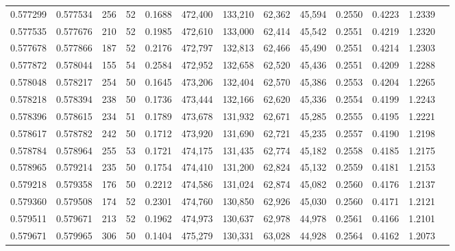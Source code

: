 \begin{tabular}{rrrrrrrrrrrrr}
0.577299 & 0.577534 &   256 &  52 &                                     0.1688 & 472,400 & 133,210 &  62,362 &  45,594 & 0.2550 & 0.4223 & 1.2339 \\
0.577535 & 0.577676 &   210 &  52 &                                     0.1985 & 472,610 & 133,000 &  62,414 &  45,542 & 0.2551 & 0.4219 & 1.2320 \\
0.577678 & 0.577866 &   187 &  52 &                                     0.2176 & 472,797 & 132,813 &  62,466 &  45,490 & 0.2551 & 0.4214 & 1.2303 \\
0.577872 & 0.578044 &   155 &  54 &                                     0.2584 & 472,952 & 132,658 &  62,520 &  45,436 & 0.2551 & 0.4209 & 1.2288 \\
0.578048 & 0.578217 &   254 &  50 &                                     0.1645 & 473,206 & 132,404 &  62,570 &  45,386 & 0.2553 & 0.4204 & 1.2265 \\
0.578218 & 0.578394 &   238 &  50 &                                     0.1736 & 473,444 & 132,166 &  62,620 &  45,336 & 0.2554 & 0.4199 & 1.2243 \\
0.578396 & 0.578615 &   234 &  51 &                                     0.1789 & 473,678 & 131,932 &  62,671 &  45,285 & 0.2555 & 0.4195 & 1.2221 \\
0.578617 & 0.578782 &   242 &  50 &                                     0.1712 & 473,920 & 131,690 &  62,721 &  45,235 & 0.2557 & 0.4190 & 1.2198 \\
0.578784 & 0.578964 &   255 &  53 &                                     0.1721 & 474,175 & 131,435 &  62,774 &  45,182 & 0.2558 & 0.4185 & 1.2175 \\
0.578965 & 0.579214 &   235 &  50 &                                     0.1754 & 474,410 & 131,200 &  62,824 &  45,132 & 0.2559 & 0.4181 & 1.2153 \\
0.579218 & 0.579358 &   176 &  50 &                                     0.2212 & 474,586 & 131,024 &  62,874 &  45,082 & 0.2560 & 0.4176 & 1.2137 \\
0.579360 & 0.579508 &   174 &  52 &                                     0.2301 & 474,760 & 130,850 &  62,926 &  45,030 & 0.2560 & 0.4171 & 1.2121 \\
0.579511 & 0.579671 &   213 &  52 &                                     0.1962 & 474,973 & 130,637 &  62,978 &  44,978 & 0.2561 & 0.4166 & 1.2101 \\
0.579671 & 0.579965 &   306 &  50 &                                     0.1404 & 475,279 & 130,331 &  63,028 &  44,928 & 0.2564 & 0.4162 & 1.2073 \\

\end{tabular}

